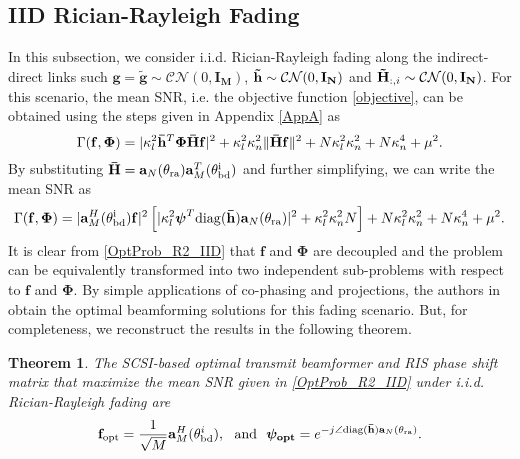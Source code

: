 \documentclass[journal,draftclsnofoot,onecolumn,12pt]{IEEEtran}
\newtheorem{theorem}{Theorem}
\begin{document}
\subsection{IID Rician-Rayleigh Fading}\label{R2_IID}
In this subsection, we consider {\rm i.i.d.} Rician-Rayleigh fading along the indirect-direct links such $\mathbf{g}=\mathbf{\tilde{g}}\sim\mathcal{C}\mathcal{N}(0,\mathbf{I_M})$, $\mathbf{\Tilde{h}}\sim\mathcal{C}\mathcal{N}(0,\mathbf{I_N})$ and $\mathbf{\Tilde{H}}_{:,i}\sim\mathcal{C}\mathcal{N}(0,\mathbf{I_N})$. For this scenario, the mean SNR, i.e. the objective function \eqref{objective}, can be obtained using the steps given in Appendix \ref{AppA} as 
\begin{equation}
    \Gamma(\mathbf{f}, \mathbf{\Phi}) = |\kappa_l^2\mathbf{\Bar{h}}^T\mathbf{\Phi\Bar{H}f}|^2 + \kappa_l^2\kappa_n^2\|\mathbf{\Bar{H}f}\|^2 + N\kappa_l^2\kappa_n^2 + N\kappa_n^4 + \mu^2. 
\end{equation}
By substituting $\mathbf{\Bar{H}} = \mathbf{a}_N(\theta_{\rm ra})\mathbf{a}^T_M(\theta_{\rm bd}^{\rm i})$ and further simplifying, we can write the mean {\rm SNR} as
\begin{align}
    \Gamma(\mathbf{f}, \mathbf{\Phi}) = |\mathbf{a}^H_M(\mathbf{\theta}_{\rm bd}^{\rm i})\mathbf{f}|^2\left[|\kappa_l^2\boldsymbol{\psi}^T{\rm diag}(\mathbf{\bar{h}})\mathbf{a}_N(\mathbf{\theta}_{\rm ra})|^2+\kappa_l^2\kappa_n^2N\right]+ N\kappa_l^2\kappa_n^2 + N\kappa_n^4 + \mu^2.\label{OptProb_R2_IID}
\end{align}
It is clear from \eqref{OptProb_R2_IID} that $\mathbf{f}$ and $\mathbf{\Phi}$ are decoupled and the problem can be equivalently transformed into two independent sub-problems with respect to $\mathbf{f}$ and $\mathbf{\Phi}$. By simple applications of co-phasing and projections, the authors in \cite{hu2020statistical} obtain the optimal beamforming solutions for this fading scenario. But, for completeness, we reconstruct the results in the following theorem.
\vspace{-0.3cm}
\begin{theorem}\label{Theo4}
    The SCSI-based optimal transmit beamformer and RIS phase shift matrix that maximize the mean SNR given in \eqref{OptProb_R2_IID} under {\rm i.i.d.} Rician-Rayleigh fading are
   \begin{align}
    \mathbf{f}_{\rm opt} = \frac{1}{\sqrt{M}}\mathbf{a}_M^H(\mathbf{\theta}_{\rm bd}^{i}),
    \text{~~and~~}\boldsymbol{\psi_{\rm opt}} =  e^{-j\angle{{\rm diag}(\mathbf{\Bar{h}})\mathbf{a}_N(\mathbf{\theta}_{\rm ra})}}.\label{OptSol_R2_IID}
    \end{align}
\end{theorem}
\end{document}

